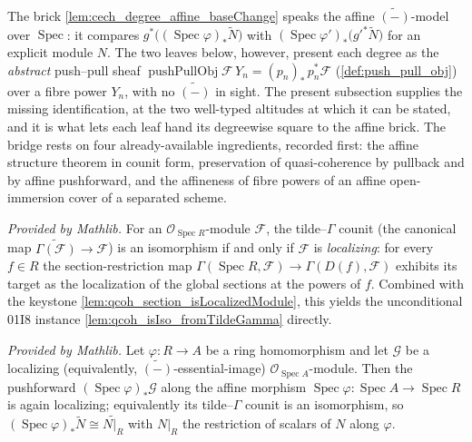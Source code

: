 The brick \cref{lem:cech_degree_affine_baseChange} speaks the affine
\(\widetilde{(-)}\)-model over \(\operatorname{Spec}\): it compares
\(g^*\bigl((\operatorname{Spec}\varphi)_*\widetilde{N}\bigr)\) with
\((\operatorname{Spec}\varphi')_*\bigl(g'^*\widetilde{N}\bigr)\) for an explicit module
\(N\). The two leaves below, however, present each degree as the \emph{abstract}
push--pull sheaf \(\operatorname{pushPullObj} \mathcal{F}\, Y_n = (p_n)_*\,p_n^*\mathcal{F}\)
(\cref{def:push_pull_obj}) over a fibre power \(Y_n\), with no \(\widetilde{(-)}\) in
sight. The present subsection supplies the missing identification, at the two well-typed
altitudes at which it can be stated, and it is what lets each leaf hand its degreewise
square to the affine brick. The bridge rests on four already-available ingredients,
recorded first: the affine structure theorem in counit form, preservation of
quasi-coherence by pullback and by affine pushforward, and the affineness of fibre powers
of an affine open-immersion cover of a separated scheme.

\begin{lemma}
  \label{lem:isIso_fromTildeGamma_iff_isLocalizing_mathlib}
  \mathlibok
  \textit{Provided by Mathlib.}
  For an \(\mathcal{O}_{\operatorname{Spec} R}\)-module \(\mathcal{F}\), the tilde--\(\Gamma\)
  counit (the canonical map \(\widetilde{\Gamma(\mathcal{F})} \to \mathcal{F}\)) is an
  isomorphism if and only if \(\mathcal{F}\) is \emph{localizing}: for every \(f \in R\)
  the section-restriction map
  \(\Gamma(\operatorname{Spec} R, \mathcal{F}) \to \Gamma(D(f), \mathcal{F})\) exhibits its
  target as the localization of the global sections at the powers of \(f\). Combined with
  the keystone \cref{lem:qcoh_section_isLocalizedModule}, this yields the unconditional
  01I8 instance \cref{lem:qcoh_isIso_fromTildeGamma} directly.
\end{lemma}

\begin{lemma}
  \label{lem:isLocalizing_pushforward_mathlib}
  \mathlibok
  \textit{Provided by Mathlib.}
  Let \(\varphi : R \to A\) be a ring homomorphism and let \(\mathcal{G}\) be a localizing
  (equivalently, \(\widetilde{(-)}\)-essential-image) \(\mathcal{O}_{\operatorname{Spec} A}\)-module.
  Then the pushforward \((\operatorname{Spec}\varphi)_*\mathcal{G}\) along the affine
  morphism \(\operatorname{Spec}\varphi : \operatorname{Spec} A \to \operatorname{Spec} R\)
  is again localizing; equivalently its tilde--\(\Gamma\) counit is an isomorphism, so
  \((\operatorname{Spec}\varphi)_*\widetilde{N} \cong \widetilde{N|_R}\) with \(N|_R\) the
  restriction of scalars of \(N\) along \(\varphi\).
\end{lemma}

